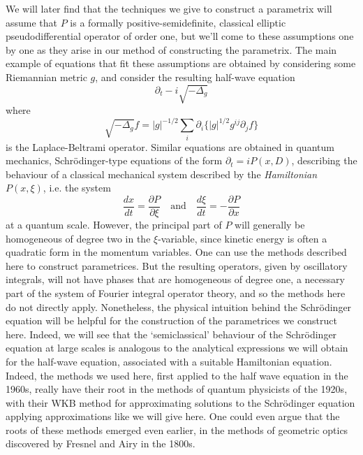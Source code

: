\documentclass{article}
\theoremstyle{plain}
\theoremstyle{remark}
\theoremstyle{definition}
\begin{document}
We will later find that the techniques we give to construct a parametrix will assume that $P$ is a formally positive-semidefinite, classical elliptic pseudodifferential operator of order one, but we'll come to these assumptions one by one as they arise in our method of constructing the parametrix. The main example of equations that fit these assumptions are obtained by considering some Riemannian metric $g$, and consider the resulting half-wave equation
%
\[ \partial_t - i \sqrt{-\Delta_g} \]
%
where
%
\[ \sqrt{-\Delta_g} f = |g|^{-1/2} \sum_i \partial_i \{ |g|^{1/2} g^{ij} \partial_j f \} \]
%
is the Laplace-Beltrami operator. Similar equations are obtained in quantum mechanics, Schr\"{o}dinger-type equations of the form $\partial_t = i P(x,D)$, describing the behaviour of a classical mechanical system described by the \emph{Hamiltonian} $P(x,\xi)$, i.e. the system
%
\[ \frac{dx}{dt} = \frac{\partial P}{\partial \xi} \quad\text{and}\quad \frac{d\xi}{dt} = - \frac{\partial P}{\partial x} \]
%
at a quantum scale. However, the principal part of $P$ will generally be homogeneous of degree two in the $\xi$-variable, since kinetic energy is often a quadratic form in the momentum variables. One can use the methods described here to construct parametrices. But the resulting operators, given by oscillatory integrals, will not have phases that are homogeneous of degree one, a necessary part of the system of Fourier integral operator theory, and so the methods here do not directly apply. Nonetheless, the physical intuition behind the Schr\"{o}dinger equation will be helpful for the construction of the parametrices we construct here. Indeed, we will see that the `semiclassical' behaviour of the Schr\"{o}dinger equation at large scales is analogous to the analytical expressions we will obtain for the half-wave equation, associated with a suitable Hamiltonian equation. Indeed, the methods we used here, first applied to the half wave equation in the 1960s, really have their root in the methods of quantum physicists of the 1920s, with their WKB method for approximating solutions to the Schr\"{o}dinger equation applying approximations like we will give here. One could even argue that the roots of these methods emerged even earlier, in the methods of geometric optics discovered by Fresnel and Airy in the 1800s.

\end{document}
